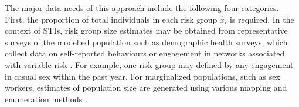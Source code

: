 \par
The major data needs of this approach include the following four categories.
First, the proportion of total individuals in each risk group $\hat{x}_i$ is required.
In the context of STIs, risk group size estimates may be
obtained from representative surveys of the modelled population
such as demographic health surveys, which collect data on
self-reported behaviours or engagement in networks associated with variable risk \citep{DHS}.
For example, one risk group may defined by any engagement in casual sex within the past year.
For marginalized populations, such as sex workers, estimates of population size
are generated using various mapping and enumeration methods \citep{Abdul-Quader2014}.
